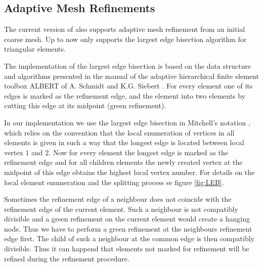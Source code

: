 \subsection{Adaptive Mesh Refinements}
\label{sect:AMR}

The current version of \LIBNAME also supports adaptive mesh refinement from an initial coarse mesh. Up to now \LIBNAME
only supports the largest edge bisection algorithm for triangular elements.

The implementation of the largest edge bisection is based on the data structure and algorithms presented in the manual
of the adaptive hierarchical finite element toolbox ALBERT of A. Schmidt and K.G. Siebert \cite{ALB00}. For every element
one of its edges is marked as the refinement edge, and the element into two elements by cutting this edge at its midpoint
(green refinement).

In our implementation we use the largest edge bisection in Mitchell's notation \cite{MI89}, which relies on the
convention that the local enumeration of vertices in all elements is given in such a way that the longest edge is located
between local vertex $1$ and $2$. Now for every element the longest edge is marked as the refinement edge and for all
children elements the newly created vertex at the midpoint of this edge obtains the highest local vertex number. For
details on the local element enumeration and the splitting process se figure \ref{fig:LEB}.

Sometimes the refinement edge of a neighbour does not coincide with the refinement edge of the current element. Such a
neighbour is not compatibly divisible and a green refinement on the current element would create a hanging node. Thus we
have to perform a green refinement at the neighbours refinement edge first. The child of such a neighbour at the common
edge is then compatibly divisible. Thus it can happend that elements not marked for refinement will be refined during the
refinement procedure.

